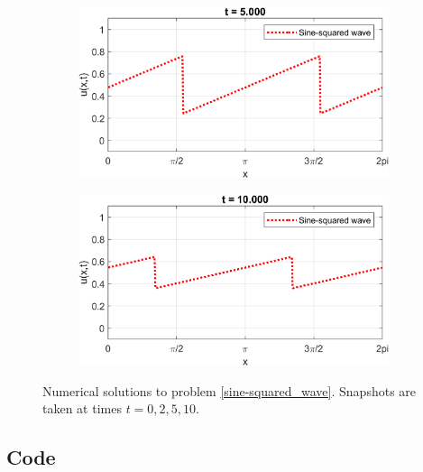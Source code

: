 \documentclass{myproject}
\begin{document}
\begin{figure}
    \begin{subfigure}[b]{0.40\textwidth}
       \includegraphics[width=1\linewidth]{sine-squared_wave_5.png}
       \caption{}
    \end{subfigure}\qquad
    \begin{subfigure}[b]{0.40\textwidth}
       \includegraphics[width=1\linewidth]{sine-squared_wave_10.png}
       \caption{}
    \end{subfigure}
    \caption{Numerical solutions to problem \eqref{sine-squared_wave}. Snapshots are taken at times $t = 0, 2, 5, 10$.}
\end{figure}

\pagebreak
\subsection{Code}
\end{document}
